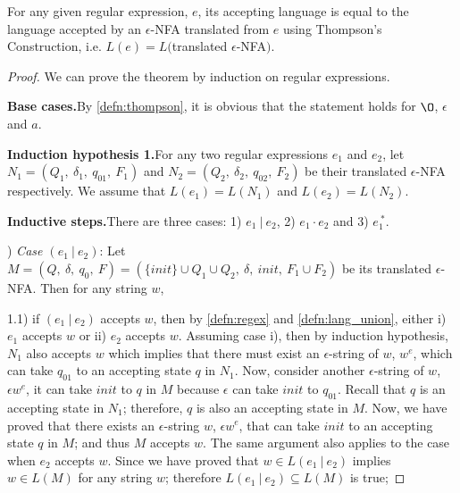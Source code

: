 \begin{thm} 
\noindent For any given regular expression, \(e\), its accepting
language is equal to the language accepted by an \(\epsilon\)-NFA
translated from \(e\) using Thompson's Construction, i.e. \(L(e) =
L(\)translated \(\epsilon\)-NFA\()\). 
\end{thm} 

\begin{proof}
\noindent We can prove the theorem by induction on regular
expressions. 

\par \noindent \textbf{Base cases.}\quad By \autoref{defn:thompson}, it is
obvious that the statement holds for \(\O\), \(\epsilon\) and
\(a\). 

\par \noindent \textbf{Induction hypothesis 1.}\quad For any two regular expressions
\(e_1\) and \(e_2\), let \(N_1 =
(Q_1,\ \delta_1,\ q_{01},\ F_1)\) and \(N_2 = (Q_2,\ \delta_2,\
q_{02},\ F_2)\) be their translated \(\epsilon\)-NFA 
respectively. We assume that \(L(e_1) = L(N_1)\) and \(L(e_2) =
L(N_2)\). 

\par \noindent \textbf{Inductive steps.}\quad There are three cases: 1)
\(e_1\ |\ e_2\), 2) \(e_1 \cdot e_2\) and 3) \(e_1^{\ *}\). 

\par {}) \textit{Case \((e_1\ |\ e_2)\)}: Let \(M = (Q,\ \delta,\ q_0,\ F) = (\{init\} \cup Q_1 \cup Q_2,\
\delta,\ init,\ F_1 \cup F_2)\) be its translated \(\epsilon\)-NFA. Then for any string \(w\), 

\par 1.1) if \((e_1\ |\ e_2)\) accepts \(w\), then by
\autoref{defn:regex} and \autoref{defn:lang_union},
either i) \(e_1\) accepts \(w\) or ii) \(e_2\) accepts \(w\). Assuming case i), then by
induction hypothesis, \(N_1\) also accepts \(w\) which implies that
there must exist an \(\epsilon\)-string of \(w\), \(w^e\), which can take \(q_{01}\)
to an accepting state \(q\) in \(N_1\). Now, consider another
\(\epsilon\)-string of \(w\), \(\epsilon w^e\), it can
take \(init\) to \(q\) in \(M\) because \(\epsilon\) can take \(init\)
to \(q_{01}\). Recall that \(q\) is an accepting
state in \(N_1\); therefore, \(q\) is also an accepting state in
\(M\). Now, we have proved that there exists an \(\epsilon\)-string
\(w\), \(\epsilon w^e\), that can take \(init\) to an accepting state
\(q\) in \(M\); and thus \(M\) accepts \(w\). The same argument also applies
to the case when \(e_2\) accepts \(w\). Since we have proved that
\(w \in L(e_1\ |\ e_2)\) implies \(w \in L(M)\) for any string \(w\);
therefore \(L(e_1\ |\ e_2) \subseteq L(M)\) is true; 


\end{proof}
